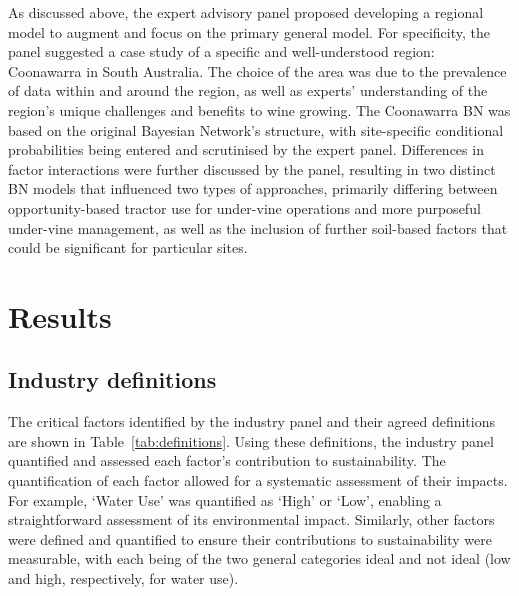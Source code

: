 \documentclass[10pt,letterpaper]{article}
\begin{document}
As discussed above, the expert advisory panel proposed developing a regional model to augment and focus on the primary general model. For specificity, the panel suggested a case study of a specific and well-understood region: Coonawarra in South Australia. The choice of the area was due to the prevalence of data within and around the region, as well as experts' understanding of the region's unique challenges and benefits to wine growing. The Coonawarra BN was based on the original Bayesian Network's structure, with site-specific conditional probabilities being entered and scrutinised by the expert panel. Differences in factor interactions were further discussed by the panel, resulting in two distinct BN models that influenced two types of approaches, primarily differing between opportunity-based tractor use for under-vine operations and more purposeful under-vine management, as well as the inclusion of further soil-based factors that could be significant for particular sites.



\section*{Results}


\subsection*{Industry definitions}

The critical factors identified by the industry panel and their agreed definitions are shown in Table~\ref{tab:definitions}. Using these definitions, the industry panel quantified and assessed each factor's contribution to sustainability. The quantification of each factor allowed for a systematic assessment of their impacts. For example, `Water Use' was quantified as `High' or `Low', enabling a straightforward assessment of its environmental impact. Similarly, other factors were defined and quantified to ensure their contributions to sustainability were measurable, with each being of the two general categories ideal and not ideal (low and high, respectively, for water use).

% 
% 
\end{document}
